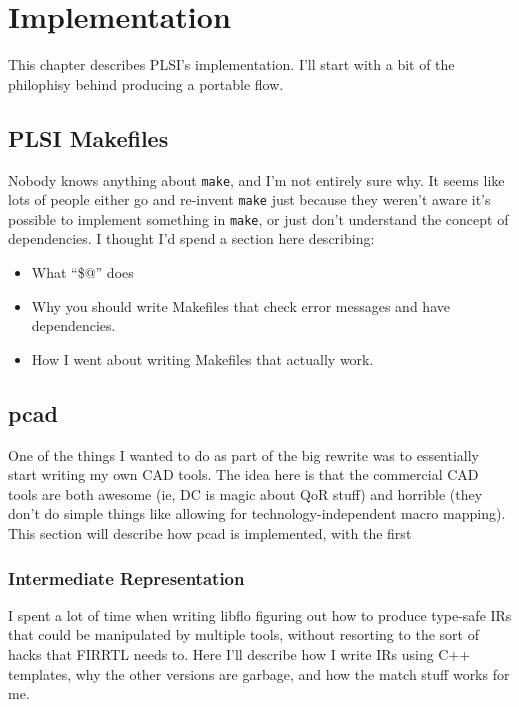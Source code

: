 \documentclass{article}
\begin{document}
\chapter{Implementation}

This chapter describes PLSI's implementation.  I'll start with a bit of the
philophisy behind producing a portable flow.

\section{PLSI Makefiles}

Nobody knows anything about \texttt{make}, and I'm not entirely sure why.  It
seems like lots of people either go and re-invent \texttt{make} just because
they weren't aware it's possible to implement something in \texttt{make}, or
just don't understand the concept of dependencies.  I thought I'd spend a
section here describing:

\begin{itemize}
\item What ``\$@'' does
\item Why you should write Makefiles that check error messages and have
dependencies.
\item How I went about writing Makefiles that actually work.
\end{itemize}

\section{pcad}

One of the things I wanted to do as part of the big rewrite was to
essentially start writing my own CAD tools.  The idea here is that the
commercial CAD tools are both awesome (ie, DC is magic about QoR stuff) and
horrible (they don't do simple things like allowing for
technology-independent macro mapping).  This section will describe how pcad
is implemented, with the first 

\subsection{Intermediate Representation}

I spent a lot of time when writing libflo figuring out how to produce
type-safe IRs that could be manipulated by multiple tools, without resorting
to the sort of hacks that FIRRTL needs to.  Here I'll describe how I write
IRs using C++ templates, why the other versions are garbage, and how the
match stuff works for me.
\end{document}
